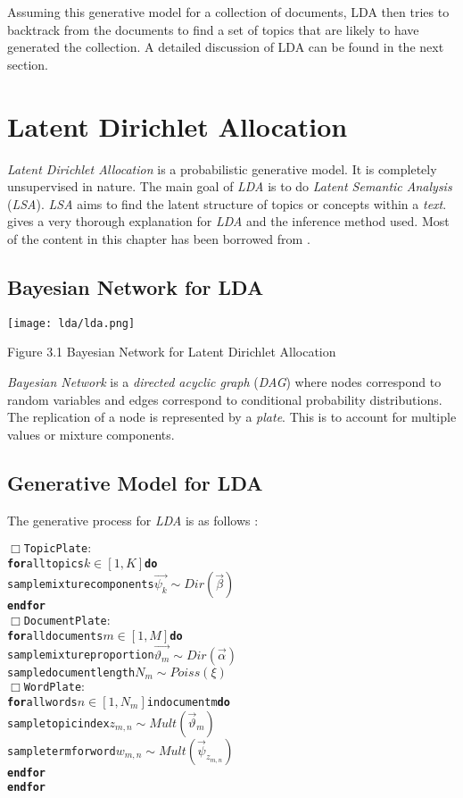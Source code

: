 Assuming this generative model for a collection of documents, LDA then tries to backtrack from the documents to find a set of 
topics that are likely to have generated the collection. A detailed discussion of LDA can be found in the next section.

\section{Latent Dirichlet Allocation}

\par

\textit{Latent Dirichlet Allocation} is a probabilistic generative model. It is completely unsupervised in nature. The main goal of 
\textit{LDA} is to do \textit{Latent Semantic Analysis} (\textit{LSA}). \textit{LSA} aims to find the latent structure of topics or 
concepts within a \textit{text}. \citep*{heinrich2005parameter} gives a very thorough explanation for \textit{LDA} and the inference 
method used. Most of the content in this chapter has been borrowed from \citep*{heinrich2005parameter}.

\subsection{Bayesian Network for LDA}

\texttt{[image: lda/lda.png]} 
\begin{center}
 Figure 3.1 Bayesian Network for Latent Dirichlet Allocation
\end{center}

\textit{Bayesian Network} is a \textit{directed acyclic graph} (\textit{DAG}) where nodes correspond to random variables and edges correspond
to conditional probability distributions. The replication of a node is represented by a \textit{plate}. This is to account for multiple
values or mixture components.

\subsection{Generative Model for LDA}

The generative process for \textit{LDA} is as follows \(\colon\)

\begin{alltt}
\(\Box\) Topic Plate \(\colon\)
\textbf{for} all topics \( k \in [1,K] \) \textbf{do}
  sample mixture components \( \vec{\psi_k} \sim Dir(\vec{\beta}) \)
\textbf{end for}
\(\Box\) Document Plate \(\colon\)
\textbf{for} all documents \( m \in [1,M] \) \textbf{do}
  sample mixture proportion \( \vec{\vartheta_m} \sim Dir(\vec{\alpha}) \)
  sample document length \( N_m \sim Poiss(\xi)\)
  \(\Box\) Word Plate \(\colon\)
  \textbf{for} all words \( n \in [1,N_m] \) in document m \textbf{do}
    sample topic index \( z_{m,n} \sim Mult(\vec{\vartheta}_m) \)
    sample term for word \( w_{m,n} \sim Mult(\vec{\psi}_{z_{m,n}}) \)
  \textbf{end for}
\textbf{end for}
\end{alltt}

